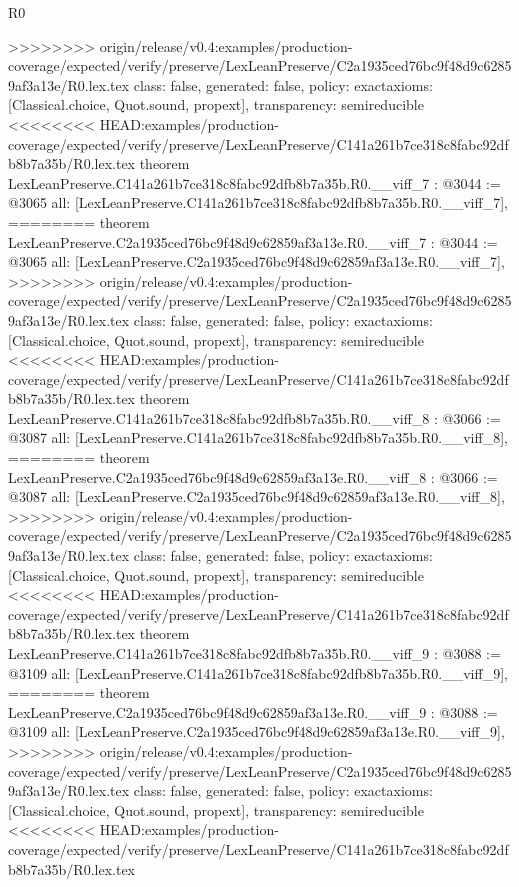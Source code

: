\begin{lexlean}{R0}
\begin{coremodule}
{{{{{{{{{{{{{{{{{{{{{{{{{{{{{{{{{{{{{{{{{{{{{{{{{{{{{{{{{{{{{{{{>>>>>>>> origin/release/v0.4:examples/production-coverage/expected/verify/preserve/LexLeanPreserve/C2a1935ced76bc9f48d9c62859af3a13e/R0.lex.tex
  class: false,
  generated: false,
  policy: exact{axioms: [Classical.choice, Quot.sound, propext]},
  transparency: semireducible
}
<<<<<<<< HEAD:examples/production-coverage/expected/verify/preserve/LexLeanPreserve/C141a261b7ce318c8fabc92dfb8b7a35b/R0.lex.tex
theorem LexLeanPreserve.C141a261b7ce318c8fabc92dfb8b7a35b.R0.__viff_7 : @3044 := @3065 {
  all: [LexLeanPreserve.C141a261b7ce318c8fabc92dfb8b7a35b.R0.__viff_7],
========
theorem LexLeanPreserve.C2a1935ced76bc9f48d9c62859af3a13e.R0.__viff_7 : @3044 := @3065 {
  all: [LexLeanPreserve.C2a1935ced76bc9f48d9c62859af3a13e.R0.__viff_7],
>>>>>>>> origin/release/v0.4:examples/production-coverage/expected/verify/preserve/LexLeanPreserve/C2a1935ced76bc9f48d9c62859af3a13e/R0.lex.tex
  class: false,
  generated: false,
  policy: exact{axioms: [Classical.choice, Quot.sound, propext]},
  transparency: semireducible
}
<<<<<<<< HEAD:examples/production-coverage/expected/verify/preserve/LexLeanPreserve/C141a261b7ce318c8fabc92dfb8b7a35b/R0.lex.tex
theorem LexLeanPreserve.C141a261b7ce318c8fabc92dfb8b7a35b.R0.__viff_8 : @3066 := @3087 {
  all: [LexLeanPreserve.C141a261b7ce318c8fabc92dfb8b7a35b.R0.__viff_8],
========
theorem LexLeanPreserve.C2a1935ced76bc9f48d9c62859af3a13e.R0.__viff_8 : @3066 := @3087 {
  all: [LexLeanPreserve.C2a1935ced76bc9f48d9c62859af3a13e.R0.__viff_8],
>>>>>>>> origin/release/v0.4:examples/production-coverage/expected/verify/preserve/LexLeanPreserve/C2a1935ced76bc9f48d9c62859af3a13e/R0.lex.tex
  class: false,
  generated: false,
  policy: exact{axioms: [Classical.choice, Quot.sound, propext]},
  transparency: semireducible
}
<<<<<<<< HEAD:examples/production-coverage/expected/verify/preserve/LexLeanPreserve/C141a261b7ce318c8fabc92dfb8b7a35b/R0.lex.tex
theorem LexLeanPreserve.C141a261b7ce318c8fabc92dfb8b7a35b.R0.__viff_9 : @3088 := @3109 {
  all: [LexLeanPreserve.C141a261b7ce318c8fabc92dfb8b7a35b.R0.__viff_9],
========
theorem LexLeanPreserve.C2a1935ced76bc9f48d9c62859af3a13e.R0.__viff_9 : @3088 := @3109 {
  all: [LexLeanPreserve.C2a1935ced76bc9f48d9c62859af3a13e.R0.__viff_9],
>>>>>>>> origin/release/v0.4:examples/production-coverage/expected/verify/preserve/LexLeanPreserve/C2a1935ced76bc9f48d9c62859af3a13e/R0.lex.tex
  class: false,
  generated: false,
  policy: exact{axioms: [Classical.choice, Quot.sound, propext]},
  transparency: semireducible
}
<<<<<<<< HEAD:examples/production-coverage/expected/verify/preserve/LexLeanPreserve/C141a261b7ce318c8fabc92dfb8b7a35b/R0.lex.tex
}}}}}}}}}}}}}}}}}}}}}}}}}}}}}}}}}}}}}}}}}}}}}}}}}}}}}}}}}}}}}}}}}}
\end{coremodule}
\end{lexlean}
